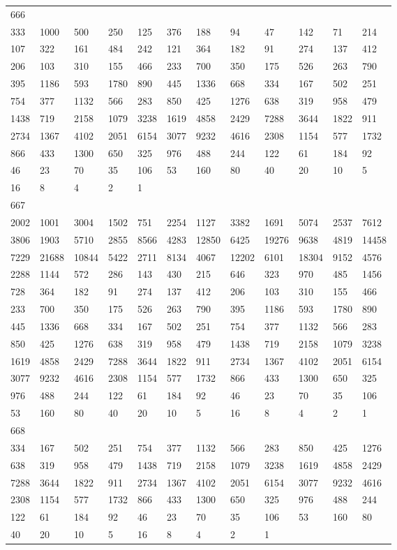 \begin{longtable}{llllllllllll}
666&&&&&&&&&&&\\
333& 1000& 500& 250& 125& 376& 188& 94& 47& 142& 71& 214\\
107& 322& 161& 484& 242& 121& 364& 182& 91& 274& 137& 412\\
206& 103& 310& 155& 466& 233& 700& 350& 175& 526& 263& 790\\
395& 1186& 593& 1780& 890& 445& 1336& 668& 334& 167& 502& 251\\
754& 377& 1132& 566& 283& 850& 425& 1276& 638& 319& 958& 479\\
1438& 719& 2158& 1079& 3238& 1619& 4858& 2429& 7288& 3644& 1822& 911\\
2734& 1367& 4102& 2051& 6154& 3077& 9232& 4616& 2308& 1154& 577& 1732\\
866& 433& 1300& 650& 325& 976& 488& 244& 122& 61& 184& 92\\
46& 23& 70& 35& 106& 53& 160& 80& 40& 20& 10& 5\\
16& 8& 4& 2& 1& \\

667&&&&&&&&&&&\\
2002& 1001& 3004& 1502& 751& 2254& 1127& 3382& 1691& 5074& 2537& 7612\\
3806& 1903& 5710& 2855& 8566& 4283& 12850& 6425& 19276& 9638& 4819& 14458\\
7229& 21688& 10844& 5422& 2711& 8134& 4067& 12202& 6101& 18304& 9152& 4576\\
2288& 1144& 572& 286& 143& 430& 215& 646& 323& 970& 485& 1456\\
728& 364& 182& 91& 274& 137& 412& 206& 103& 310& 155& 466\\
233& 700& 350& 175& 526& 263& 790& 395& 1186& 593& 1780& 890\\
445& 1336& 668& 334& 167& 502& 251& 754& 377& 1132& 566& 283\\
850& 425& 1276& 638& 319& 958& 479& 1438& 719& 2158& 1079& 3238\\
1619& 4858& 2429& 7288& 3644& 1822& 911& 2734& 1367& 4102& 2051& 6154\\
3077& 9232& 4616& 2308& 1154& 577& 1732& 866& 433& 1300& 650& 325\\
976& 488& 244& 122& 61& 184& 92& 46& 23& 70& 35& 106\\
53& 160& 80& 40& 20& 10& 5& 16& 8& 4& 2& 1\\

668&&&&&&&&&&&\\
334& 167& 502& 251& 754& 377& 1132& 566& 283& 850& 425& 1276\\
638& 319& 958& 479& 1438& 719& 2158& 1079& 3238& 1619& 4858& 2429\\
7288& 3644& 1822& 911& 2734& 1367& 4102& 2051& 6154& 3077& 9232& 4616\\
2308& 1154& 577& 1732& 866& 433& 1300& 650& 325& 976& 488& 244\\
122& 61& 184& 92& 46& 23& 70& 35& 106& 53& 160& 80\\
40& 20& 10& 5& 16& 8& 4& 2& 1& \\


\end{longtable}
